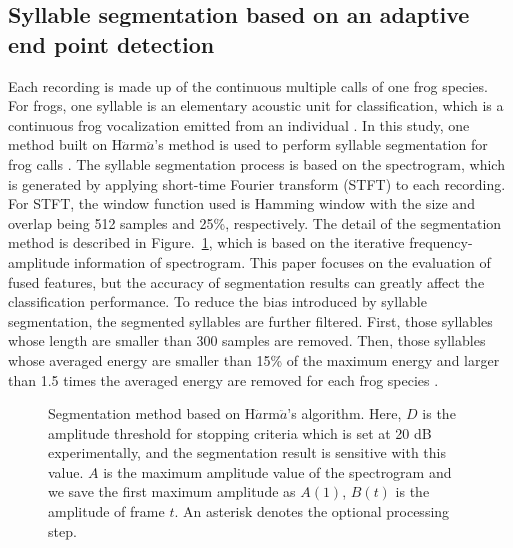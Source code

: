 \subsection{Syllable segmentation based on an adaptive end point detection}
Each recording is made up of the continuous multiple calls of one frog species. For frogs, one syllable is an elementary acoustic unit for classification, which is a continuous frog vocalization emitted from an individual \citep{huang2009frog}. In this study, one method built on H$\ddot{a}$rm$\ddot{a}$'s method is used to perform syllable segmentation for frog calls \citep{harma2003automatic}. The syllable segmentation process is based on the spectrogram, which is generated by applying short-time Fourier transform (STFT) to each recording. For STFT, the window function used is Hamming window with the size and overlap being 512 samples and 25\%, respectively. The detail of the segmentation method is described in Figure.~\ref{fig:segmentation}, which is based on the iterative frequency-amplitude information of spectrogram. This paper focuses on the evaluation of fused features, but the accuracy of segmentation results can greatly affect the classification performance. To reduce the bias introduced by syllable segmentation, the segmented syllables are further filtered. First, those syllables whose length are smaller than 300 samples are removed. Then, those syllables whose averaged energy are smaller than 15\% of the maximum energy and larger than 1.5 times the averaged energy are removed for each frog species \citep{Gingras2013}.   


\begin{figure}[htb!] %
\caption[H$\ddot{a}$rm$\ddot{a}$'s segmentation algorithm]{Segmentation method based on H$\ddot{a}$rm$\ddot{a}$'s algorithm. Here, $D$ is the amplitude threshold for stopping criteria which is set at 20 dB experimentally, and the segmentation result is sensitive with this value. $A$ is the maximum amplitude value of the spectrogram and we save the first maximum amplitude as $A(1)$, $B(t)$ is the amplitude of frame $t$. An asterisk denotes the optional processing step.}
\label{fig:segmentation} 
\end{figure}



